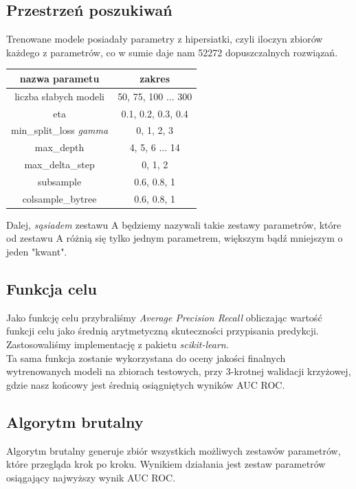 \documentclass[11pt]{article}
\begin{document}
\subsection{Przestrzeń poszukiwań}
Trenowane modele posiadały parametry z hipersiatki, czyli iloczyn zbiorów każdego z parametrów, co w sumie daje nam 52272 dopuszczalnych rozwiązań.
\begin{center}
	\begin{tabular}{|c|c|}
		\hline
		nazwa parametu & zakres \\
		\hline
		\hline
		liczba słabych modeli &  50, 75, 100 ... 300\\ %
		\hline
		eta &  0.1, 0.2, 0.3, 0.4\\ %
		\hline 
		min\_split\_loss \textit{gamma} & 0, 1, 2, 3\\ %
		\hline 
		max\_depth & 4, 5, 6 ... 14\\
		\hline 
		max\_delta\_step & 0, 1, 2\\
		\hline 
		subsample & 0.6, 0.8, 1\\
		\hline
		colsample\_bytree &  0.6, 0.8, 1\\ %
		\hline 
	\end{tabular}
\end{center}

Dalej, \textit{sąsiadem} zestawu A będziemy nazywali takie zestawy parametrów, które od zestawu A różnią się tylko jednym parametrem, większym bądź mniejszym o jeden "kwant".

\subsection{Funkcja celu}
Jako funkcję celu przybraliśmy \textit{Average Precision Recall} obliczając wartość funkcji celu jako średnią arytmetyczną skuteczności przypisania predykcji. Zastosowaliśmy implementację z pakietu \textit{scikit-learn}.\\
Ta sama funkcja zostanie wykorzystana do oceny jakości finalnych wytrenowanych modeli na zbiorach testowych, przy 3-krotnej walidacji krzyżowej, gdzie nasz końcowy jest średnią osiągniętych wyników AUC ROC.

\subsection{Algorytm brutalny}
Algorytm brutalny generuje zbiór wszystkich możliwych zestawów parametrów, które przegląda krok po kroku. Wynikiem działania jest zestaw parametrów osiągający najwyższy wynik AUC ROC.
\end{document}
